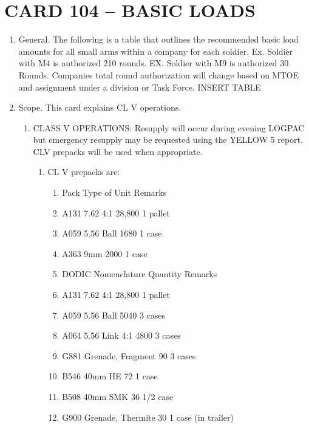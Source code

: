 \documentclass{article}
\begin{document}
\section*{CARD 104 – BASIC LOADS}
\begin{enumerate}
\item General. The following is a table that outlines the recommended basic load amounts for all small arms within a company for each soldier. Ex. Soldier with M4 is authorized 210 rounds. EX. Soldier with M9 is authorized 30 Rounds. Companies total round authorization will change based on MTOE and assignment under a division or Task Force.
INSERT TABLE
\item Scope. This card explains CL V operations.
\begin{enumerate}
\item CLASS V OPERATIONS: Resupply will occur during evening LOGPAC but emergency resupply may be requested using the YELLOW 5 report. CLV prepacks will be used when appropriate.
\begin{enumerate}
\item CL V prepacks are:
\begin{enumerate}
\item Pack Type of Unit Remarks
\item A131 7.62 4:1 28,800 1 pallet
\item A059 5.56 Ball 1680 1 case
\item A363 9mm 2000 1 case
\item DODIC Nomenclature Quantity Remarks
\item A131 7.62 4:1 28,800 1 pallet
\item A059 5.56 Ball 5040 3 cases
\item A064 5.56 Link 4:1 4800 3 cases
\item G881 Grenade, Fragment 90 3 cases
\item B546 40mm HE 72 1 case
\item B508 40mm SMK 36 1/2 case
\item G900 Grenade, Thermite 30 1 case (in trailer)
\end{enumerate}
\end{enumerate}
\end{enumerate}
\end{enumerate}

\newpage
\end{document}
